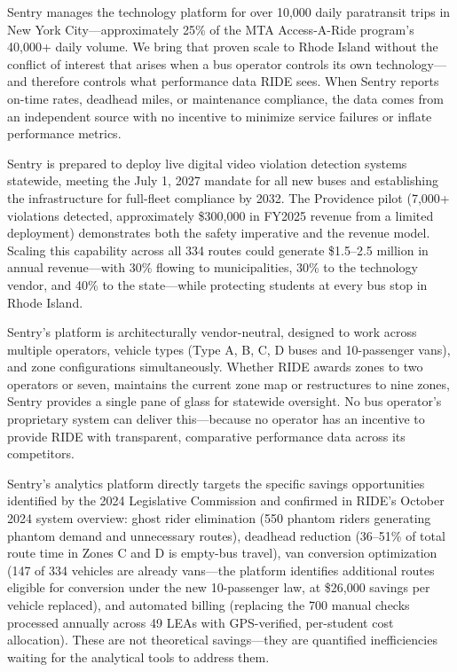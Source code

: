 \begin{description}[style=nextline, leftmargin=0.5cm]
    \item[\faIcon{check-circle} \textbf{Scale Without Conflict:}] Sentry manages the technology platform for over 10,000 daily paratransit trips in New York City---approximately 25\% of the MTA Access-A-Ride program's 40,000+ daily volume. We bring that proven scale to Rhode Island without the conflict of interest that arises when a bus operator controls its own technology---and therefore controls what performance data RIDE sees. When Sentry reports on-time rates, deadhead miles, or maintenance compliance, the data comes from an independent source with no incentive to minimize service failures or inflate performance metrics.

    \item[\faIcon{check-circle} \textbf{Video Violation Detection Readiness:}] Sentry is prepared to deploy live digital video violation detection systems statewide, meeting the July 1, 2027 mandate for all new buses and establishing the infrastructure for full-fleet compliance by 2032. The Providence pilot (7,000+ violations detected, approximately \$300,000 in FY2025 revenue from a limited deployment) demonstrates both the safety imperative and the revenue model. Scaling this capability across all 334 routes could generate \$1.5--2.5 million in annual revenue---with 30\% flowing to municipalities, 30\% to the technology vendor, and 40\% to the state---while protecting students at every bus stop in Rhode Island.

    \item[\faIcon{check-circle} \textbf{Vendor-Neutral Architecture:}] Sentry's platform is architecturally vendor-neutral, designed to work across multiple operators, vehicle types (Type A, B, C, D buses and 10-passenger vans), and zone configurations simultaneously. Whether RIDE awards zones to two operators or seven, maintains the current zone map or restructures to nine zones, Sentry provides a single pane of glass for statewide oversight. No bus operator's proprietary system can deliver this---because no operator has an incentive to provide RIDE with transparent, comparative performance data across its competitors.

    \item[\faIcon{check-circle} \textbf{Data-Driven Cost Reduction:}] Sentry's analytics platform directly targets the specific savings opportunities identified by the 2024 Legislative Commission and confirmed in RIDE's October 2024 system overview: ghost rider elimination (550 phantom riders generating phantom demand and unnecessary routes), deadhead reduction (36--51\% of total route time in Zones C and D is empty-bus travel), van conversion optimization (147 of 334 vehicles are already vans---the platform identifies additional routes eligible for conversion under the new 10-passenger law, at \$26,000 savings per vehicle replaced), and automated billing (replacing the 700 manual checks processed annually across 49 LEAs with GPS-verified, per-student cost allocation). These are not theoretical savings---they are quantified inefficiencies waiting for the analytical tools to address them.


\end{description}
